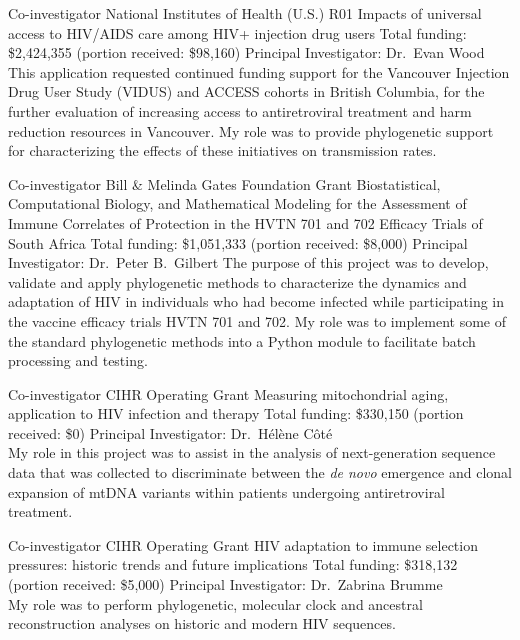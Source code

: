 \documentclass[11pt]{moderncv}
\begin{document}
{Co-investigator}
{National Institutes of Health (U.S.) R01}
{Impacts of universal access to HIV/AIDS care among HIV+ injection drug users}
{Total funding: \$2,424,355 (portion received: \$98,160)}
{
Principal Investigator: Dr.~Evan Wood\\
This application requested continued funding support for the Vancouver Injection Drug User Study (VIDUS) and ACCESS cohorts in British Columbia, for the further evaluation of increasing access to antiretroviral treatment and harm reduction resources in Vancouver.
My role was to provide phylogenetic support for characterizing the effects of these initiatives on transmission rates.\\
}


{Co-investigator}
{Bill \& Melinda Gates Foundation Grant}
{Biostatistical, Computational Biology, and Mathematical Modeling for the Assessment of
Immune Correlates of Protection in the HVTN 701 and 702 Efficacy Trials of South Africa}
{Total funding: \$1,051,333 (portion received: \$8,000)}
{
Principal Investigator: Dr.~Peter B.~Gilbert
The purpose of this project was to develop, validate and apply phylogenetic methods to characterize the dynamics and adaptation of HIV in individuals who had become infected while participating in the vaccine efficacy trials HVTN 701 and 702.
My role was to implement some of the standard phylogenetic methods into a Python module to facilitate batch processing and testing.\\
}


{Co-investigator}
{CIHR Operating Grant}
{Measuring mitochondrial aging, application to HIV infection and therapy}
{Total funding: \$330,150 (portion received: \$0)}
{
Principal Investigator: Dr.~H\'el\`ene C\^ot\'e\\
My role in this project was to assist in the analysis of next-generation sequence data that was collected to discriminate between the \textit{de novo} emergence and clonal expansion of mtDNA variants within patients undergoing antiretroviral treatment.\\
}

{Co-investigator}
{CIHR Operating Grant}
{HIV adaptation to immune selection pressures: historic trends and future implications}
{Total funding: \$318,132 (portion received: \$5,000)}
{
Principal Investigator: Dr.~Zabrina Brumme\\
My role was to perform phylogenetic, molecular clock and ancestral reconstruction analyses on historic and modern HIV sequences.\\
}
\end{document}

